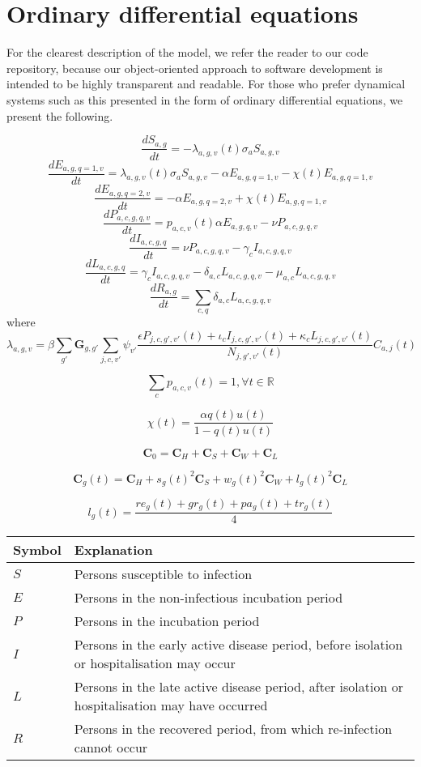 
\section{Ordinary differential equations}

For the clearest description of the model, we refer the reader to our code repository, because our object-oriented approach to software development is intended to be highly transparent and readable. For those who prefer dynamical systems such as this presented in the form of ordinary differential equations, we present the following.

\[\frac{dS_{a,g}}{dt}=-\lambda_{a,g,v}(t) \sigma_{a} S_{a,g,v}\]
\[\frac{dE_{a,g,q=1,v}}{dt}=\lambda_{a,g,v}(t) \sigma_{a} S_{a,g,v} -\alpha E_{a,g,q=1,v} - \chi(t) E_{a,g,q=1,v} \]
\[\frac{dE_{a,g,q=2,v}}{dt}=-\alpha E_{a,g,q=2,v} + \chi(t) E_{a,g,q=1,v} \]
\[\frac{dP_{a,c,g,q,v}}{dt}=p_{a,c,v}(t) \alpha E_{a,g,q,v}-\nu P_{a,c,g,q,v}\]
\[\frac{dI_{a,c,g,q}}{dt}=\nu P_{a,c,g,q,v}-\gamma_{c}I_{a,c,g,q,v}\]
\[\frac{dL_{a,c,g,q}}{dt}=\gamma_{c}I_{a,c,g,q,v}-\delta_{a,c}L_{a,c,g,q,v}-\mu_{a,c}L_{a,c,g,q,v}\]
\[\frac{dR_{a,g}}{dt}=\sum_{c,q}{}\delta_{a,c}L_{a,c,g,q,v}\]
where
\[\lambda_{a,g,v}=\beta \sum_{g'}\textbf{G}_{g,g'} \sum_{j,c,v'} \psi_{v'} \frac{\epsilon P_{j,c,g',v'}(t)+\iota_{c}I_{j,c,g',v'}(t)+\kappa_{c}L_{j,c,g',v'}(t)}{N_{j,g',v'}(t)} C_{a,j}(t)\]

\[\sum_{c}p_{a,c,v}(t)=1,\forall t\in\mathbb{R}\]

\[\chi(t) = \frac{\alpha q(t) u(t)}{1 - q(t) u(t)}\]

\[\textbf{C}_{0}=\textbf{C}_{H}+\textbf{C}_{S}+\textbf{C}_{W}+\textbf{C}_{L}\]

\[\textbf{C}_{g}(t)=\textbf{C}_{H}+s_{g}(t)^{2}\textbf{C}_{S}+w_{g}(t)^{2}\textbf{C}_{W}+l_{g}(t)^{2}\textbf{C}_{L}\]

\[l_{g}(t)=\frac{re_{g}(t)+gr_{g}(t)+pa_{g}(t)+tr_{g}(t)}{4}\]

\begin{table}[ht]
\renewcommand{\baselinestretch}{1}
    	\begin{tabular}{| p{2cm} | p{11.1cm} |}
    	\hline
    		Symbol & Explanation \\
	    	\hline
	    	$S$ & Persons susceptible to infection \\
    		$E$ & Persons in the non-infectious incubation period \\
    		$P$ & Persons in the incubation period \\
    		$I$ & Persons in the early active disease period, before isolation or hospitalisation may occur \\
    		$L$ & Persons in the late active disease period, after isolation or hospitalisation may have occurred \\
    		$R$ & Persons in the recovered period, from which re-infection cannot occur \\
    		\hline
	\end{tabular}
\end{table}


